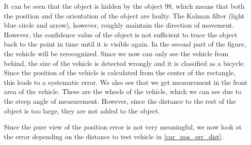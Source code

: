 \documentclass[11pt,oneside,openright]{mpreport}
\begin{document}

It can be seen that the object is hidden by the object 98, which means that both the position and the orientation of the object are faulty. 
The Kalman filter (light blue circle and arrow), however, roughly maintain the direction of movement.
However, the confidence value of the object is not sufficient to trace the object back to the point in time until it is visible again. 
In the second part of the figure, the vehicle will be rerecognized. 
Since we now can only see the vehicle from behind, the size of the vehicle is detected wrongly and it is classified as a bicycle.
Since the position of the vehicle is calculated from the center of the rectangle, this leads to a systematic error. 
We also see that we get measurement in the front area of the vehicle. These are the wheels of the vehicle, which we can see due to the steep angle of measurement. 
However, since the distance to the rest of the object is too large, they are not added to the object.

Since the pure view of the position error is not very meaningful, we now look at the error depending on the distance to test vehicle in \cref{car_pos_err_dist}.
\end{document}
